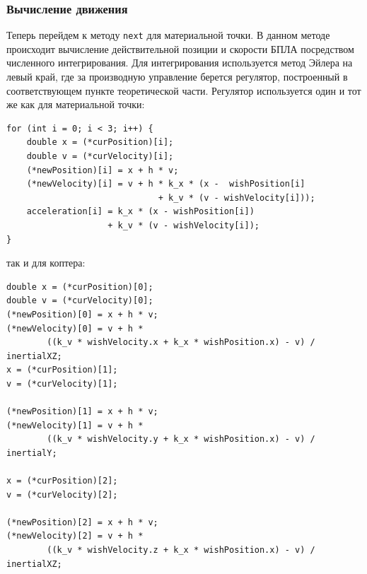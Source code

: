 \documentclass[a4paper,12pt]{article}
\begin{document}
\subsubsection{Вычисление движения}
Теперь перейдем к методу \texttt{next} для материальной точки. В данном методе происходит вычисление действительной позиции и скорости БПЛА посредством численного интегрирования. Для интегрирования используется метод Эйлера на левый край, где за производную управление берется регулятор, построенный в соответствующем пункте теоретической части. Регулятор используется один и тот же как для материальной точки:
\begin{verbatim}
for (int i = 0; i < 3; i++) {
    double x = (*curPosition)[i];
    double v = (*curVelocity)[i];
    (*newPosition)[i] = x + h * v;
    (*newVelocity)[i] = v + h * k_x * (x -  wishPosition[i] 
                              + k_v * (v - wishVelocity[i]));
    acceleration[i] = k_x * (x - wishPosition[i]) 
                    + k_v * (v - wishVelocity[i]);
}
\end{verbatim}
так и для коптера:
\begin{verbatim}
double x = (*curPosition)[0];
double v = (*curVelocity)[0];
(*newPosition)[0] = x + h * v;
(*newVelocity)[0] = v + h * 
        ((k_v * wishVelocity.x + k_x * wishPosition.x) - v) / inertialXZ;
x = (*curPosition)[1];
v = (*curVelocity)[1];

(*newPosition)[1] = x + h * v;
(*newVelocity)[1] = v + h * 
        ((k_v * wishVelocity.y + k_x * wishPosition.x) - v) / inertialY;

x = (*curPosition)[2];
v = (*curVelocity)[2];

(*newPosition)[2] = x + h * v;
(*newVelocity)[2] = v + h * 
        ((k_v * wishVelocity.z + k_x * wishPosition.x) - v) / inertialXZ;
\end{verbatim}
\end{document}
